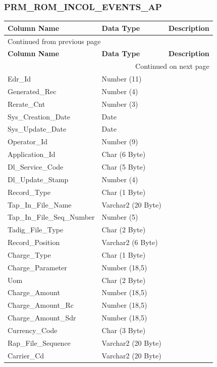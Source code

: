 \documentclass[12pt,twoside]{article}
\begin{document}
\subsubsection{PRM\_ROM\_INCOL\_EVENTS\_AP}
\label{sec:orgheadline85}
\footnotesize
\begin{longtable}{l|l|l}
\hline
\textbf{Column Name} & \textbf{Data Type} & \textbf{Description}\\
\hline
\endfirsthead
\multicolumn{3}{l}{Continued from previous page} \\
\hline

\textbf{Column Name} & \textbf{Data Type} & \textbf{Description} \\

\hline
\endhead
\hline\multicolumn{3}{r}{Continued on next page} \\
\endfoot
\endlastfoot
\hline
Edr\_Id & Number (11) & \\
Generated\_Rec & Number (4) & \\
Rerate\_Cnt & Number (3) & \\
Sys\_Creation\_Date & Date & \\
Sys\_Update\_Date & Date & \\
Operator\_Id & Number (9) & \\
Application\_Id & Char (6 Byte) & \\
Dl\_Service\_Code & Char (5 Byte) & \\
Dl\_Update\_Stamp & Number (4) & \\
Record\_Type & Char (1 Byte) & \\
Tap\_In\_File\_Name & Varchar2 (20 Byte) & \\
Tap\_In\_File\_Seq\_Number & Number (5) & \\
Tadig\_File\_Type & Char (2 Byte) & \\
Record\_Position & Varchar2 (6 Byte) & \\
Charge\_Type & Char (1 Byte) & \\
Charge\_Parameter & Number (18,5) & \\
Uom & Char (2 Byte) & \\
Charge\_Amount & Number (18,5) & \\
Charge\_Amount\_Rc & Number (18,5) & \\
Charge\_Amount\_Sdr & Number (18,5) & \\
Currency\_Code & Char (3 Byte) & \\
Rap\_File\_Sequence & Varchar2 (20 Byte) & \\
Carrier\_Cd & Varchar2 (20 Byte) & \\

\end{longtable}
\end{document}
